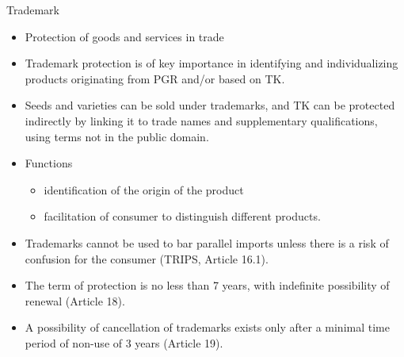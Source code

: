 \documentclass[ignorenonframetext,aspectratio=169]{beamer}
\providecommand{\tightlist}{%
  \setlength{\itemsep}{0pt}\setlength{\parskip}{0pt}}
\begin{document}
\begin{frame}{Trademark}
\protect\hypertarget{trademark}{}

\begin{itemize}
\tightlist
\item
  Protection of goods and services in trade
\item
  Trademark protection is of key importance in identifying and
  individualizing products originating from PGR and/or based on TK.
\item
  Seeds and varieties can be sold under trademarks, and TK can be
  protected indirectly by linking it to trade names and supplementary
  qualifications, using terms not in the public domain.
\item
  Functions

  \begin{itemize}
  \tightlist
  \item
    identification of the origin of the product
  \item
    facilitation of consumer to distinguish different products.
  \end{itemize}
\item
  Trademarks cannot be used to bar parallel imports unless there is a
  risk of confusion for the consumer (TRIPS, Article 16.1).
\item
  The term of protection is no less than 7 years, with indefinite
  possibility of renewal (Article 18).
\item
  A possibility of cancellation of trademarks exists only after a
  minimal time period of non-use of 3 years (Article 19).
\end{itemize}

\end{frame}
\end{document}
